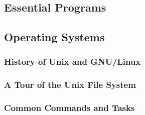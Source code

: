 
\subsection{Essential Programs}



\subsection{Operating Systems}



\subsubsection{History of Unix and GNU/Linux}


\subsubsection{A Tour of the Unix File System}



\subsubsection{Common Commands and Tasks}


